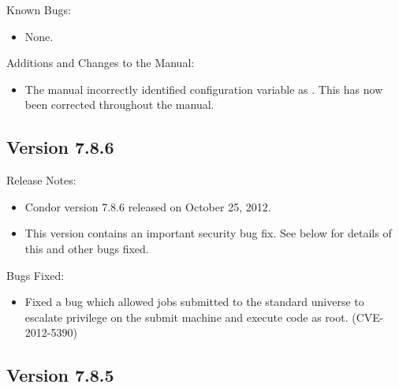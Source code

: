 \noindent Known Bugs:

\begin{itemize}

\item None.

\end{itemize}

\noindent Additions and Changes to the Manual:

\begin{itemize}

\item The manual incorrectly identified configuration variable
 as .
This has now been corrected throughout the manual.

\end{itemize}


\subsection*{\label{sec:New-7-8-6}Version 7.8.6}

\noindent Release Notes:

\begin{itemize}

\item Condor version 7.8.6 released on October 25, 2012.

\item \Security This version contains an important security bug fix.  See below
for details of this and other bugs fixed.

\end{itemize}

\noindent Bugs Fixed:

\begin{itemize}

\item \Security Fixed a bug which allowed jobs submitted to the standard
universe to escalate privilege on the submit machine and execute code as root.
(CVE-2012-5390)

\end{itemize}


\subsection*{\label{sec:New-7-8-5}Version 7.8.5}


